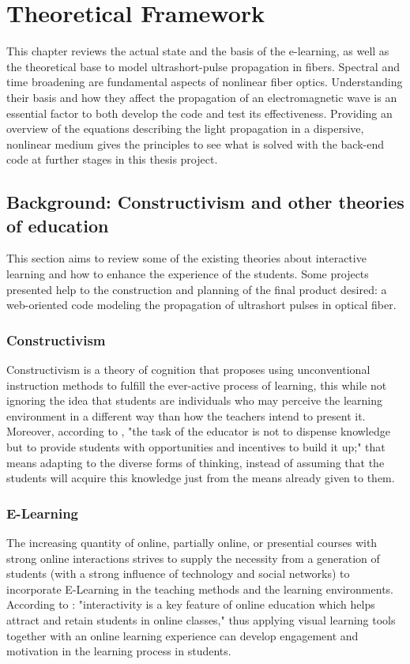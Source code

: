 \chapter{Theoretical Framework}

This chapter reviews the actual state and the basis of the e-learning, as well as the theoretical base to model ultrashort-pulse propagation in fibers. Spectral and time broadening are fundamental aspects of nonlinear fiber optics. Understanding their basis and how they affect the propagation of an electromagnetic wave is an essential factor to both develop the code and test its effectiveness. Providing an overview of the equations describing the light propagation in a dispersive, nonlinear medium gives the principles to see what is solved with the back-end code at further stages in this thesis project.




\section{Background: Constructivism and other theories of education}
This section aims to review some of the existing theories about interactive learning and how to enhance the experience of the students. Some projects presented help to the construction and planning of the final product desired: a web-oriented code modeling the propagation of ultrashort pulses in optical fiber.



\subsection{Constructivism}
Constructivism is a theory of cognition that proposes using unconventional instruction methods to fulfill the ever-active process of learning, this while not ignoring the idea that students are individuals who may perceive the learning environment in a different way than how the teachers intend to present it. Moreover, according to \cite{fosnot2013constructivism}, "the task of the educator is not to dispense knowledge but to provide students with opportunities and incentives to build it up;" that means adapting to the diverse forms of thinking, instead of assuming that the students will acquire this knowledge just from the means already given to them.


\subsection{E-Learning}
The increasing quantity of online, partially online, or presential courses with strong online interactions strives to supply the necessity from a generation of students (with a strong influence of technology and social networks) to incorporate E-Learning in the teaching methods and the learning environments.  According to \cite{vltool}: "interactivity is a key feature of online education which helps attract and retain students in online classes," thus applying visual learning tools together with an online learning experience can develop engagement and motivation in the learning process in students. 

